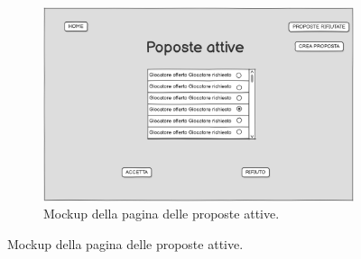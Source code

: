 \begin{figure}[H]
    \centering

    \begin{subfigure}[b]{0.49\textwidth}
        \centering
        \includegraphics[width=\textwidth]{Resources/Mockups/ProposteAttive.png}
        \caption{Mockup della pagina delle proposte attive.}
        \label{fig:pagina_proposte_attive}
    \end{subfigure}
    \hfill
   

\end{figure}

